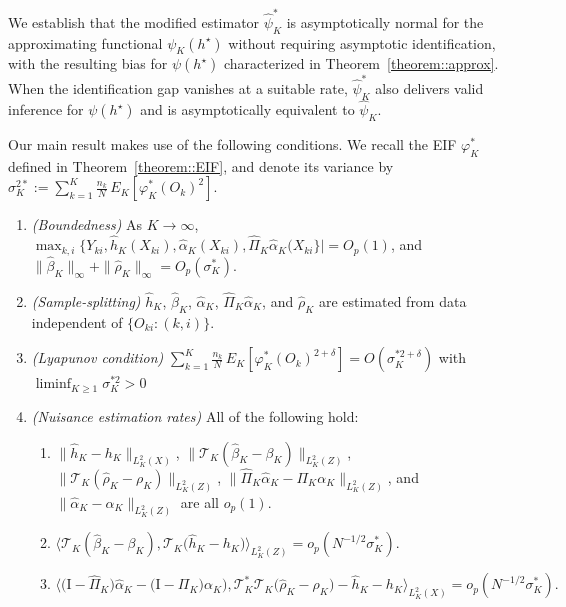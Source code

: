 \documentclass[11pt]{article}
\theoremstyle{plain}
\theoremstyle{definition}
\theoremstyle{remark}
\theoremstyle{definition}
\begin{document}
We establish that the modified estimator \( \widehat{\psi}_K^* \) is asymptotically normal for the approximating functional \( \psi_K(h^\star) \) without requiring asymptotic identification, with the resulting bias for $\psi(h^\star)$ characterized in Theorem~\ref{theorem::approx}. When the identification gap vanishes at a suitable rate, \( \widehat{\psi}_K^* \) also delivers valid inference for \( \psi(h^\star) \) and is asymptotically equivalent to \( \widehat{\psi}_K \).



 Our main result makes use of the following conditions. We recall the EIF $\varphi_K^*$ defined in Theorem~\ref{theorem::EIF}, and denote its variance by  $\sigma_K^{2*} := \sum_{k=1}^K \frac{n_k}{N} \, E_K\left[\varphi_K^*(O_k)^2\right].$ 

\begin{enumerate}[label=\bf{E\arabic*)}, ref={E\arabic*}, series=cond2]
        \item \textit{(Boundedness)} 
          As $K \rightarrow \infty$,  $ \max_{k,i} \{Y_{ki}, \widehat{h}_K(X_{ki}), \widehat{\alpha}_K(X_{ki}), \widehat{\Pi}_K  \widehat{\alpha}_{K}(X_{ki}\}|= O_p(1)$, and $\|\widehat{\beta}_K\|_{\infty} + \|\widehat{\rho}_K\|_{\infty} = O_p(\sigma_K^*)$.   \label{cond::bound2}
    \item \textit{(Sample-splitting)} \label{cond::split2} $\widehat{h}_K$, $\widehat{\beta}_K$, $\widehat{\alpha}_K$, $\widehat{\Pi}_K \widehat{\alpha}_K$, and $\widehat{\rho}_K$ are estimated from data independent of $\{O_{ki}: (k,i)\}$.
        \item  \textit{(Lyapunov condition)} $\sum_{k=1}^K \frac{n_k}{N} \, E_K\left[\varphi_K^*(O_k)^{2 + \delta} \right]   = O(\sigma_K^{*2 + \delta})$   with $\liminf_{K \geq 1} \sigma_K^{*2} > 0$ \label{cond::lyaponov2}
    \item \label{cond::nuisrate2} \textit{(Nuisance estimation rates)} All of the following hold:
    \begin{enumerate}[label={(\roman*)}, ref={\ref{cond::nuisrate2}(\roman*)}]
        \item $\|  \widehat{h}_K - h_K\|_{L^2_K(X)}$, $\| \mathcal{T}_{K}( \widehat{\beta}_K - \beta_{K}) \|_{L^2_K(Z)}  $, $\| \mathcal{T}_{K}( \widehat{\rho}_K - \rho_{K}) \|_{L^2_K(Z)} $, $\|  \widehat{\Pi}_K  \widehat{\alpha}_{K}-  \Pi_{K}  \alpha_K  \|_{L^2_K(Z)}$, and $\|    \widehat{\alpha}_{K}   -  \alpha_K  \|_{L^2_K(Z)}$ are all $o_p(1)$.  
        \item   \(\big \langle \mathcal{T}_{K}( \widehat{\beta}_K - \beta_{K}) , \mathcal{T}_{K} \big( \widehat{h}_K - h_K \big) \big \rangle_{L^2_K(Z)}  = o_p(N^{-1/2}\sigma_K^{*})\).  
        \item \label{cond::nuisrates_new} $\big \langle   \big( \text{I} - \widehat{\Pi}_K \big) \widehat{\alpha}_{K} - \big( \text{I} - \Pi_{K} \big) \alpha_K \big), 
   \mathcal{T}_K^*\mathcal{T}_{K} \big(\widehat{\rho}_K -  \rho_K \big) -    \widehat{h}_K - h_K    \big  \rangle_{L^2_K(X)}  = o_p(N^{-1/2}\sigma_K^{*}).$ 
    \end{enumerate}
\end{enumerate}
\end{document}
